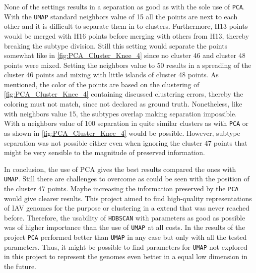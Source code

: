 None of the settings results in a separation as good as with the sole use of \texttt{PCA}. With the \texttt{UMAP} standard neighbors value of 15 all the points are next to each other and it is difficult to separate them in to clusters. Furthermore, H13 points would be merged with H16 points before merging with others from H13, thereby breaking the subtype division. Still this setting would separate the points somewhat like in \autoref{fig:PCA_Cluster_Knee_4} since no cluster 46 and cluster 48 points were mixed. Setting the neighbors value to 50 results in a spreading of the cluster 46 points and mixing with little islands of cluster 48 points. As mentioned, the color of the points are based on the clustering of \autoref{fig:PCA_Cluster_Knee_4} containing discussed clustering errors, thereby the coloring must not match, since not declared as ground truth. Nonetheless, like with neighbors value 15, the subtypes overlap making separation impossible. With a neighbors value of 100 separation in quite similar clusters as with \texttt{PCA} or as shown in \autoref{fig:PCA_Cluster_Knee_4} would be possible. However, subtype separation was not possible either even when ignoring the cluster 47 points that might be very sensible to the magnitude of preserved information.


In conclusion, the use of PCA gives the best results compared the ones with \texttt{UMAP}. Still there are challenges to overcome as could be seen with the position of the cluster 47 points. Maybe increasing the information preserved by the \texttt{PCA} would give clearer results. This project aimed to find high-quality representations of \gls{IAV} genomes for the purpose or clustering in a extend that was never reached before. Therefore, the usability of \texttt{HDBSCAN} with parameters as good as possible was of higher importance than the use of \texttt{UMAP} at all costs. In the results of the project \texttt{PCA} performed better than \texttt{UMAP} in any case but only with all the tested parameters. Thus, it might be possible to find parameters for \texttt{UMAP} not explored in this project to represent the genomes even better in a equal low dimension in the future.